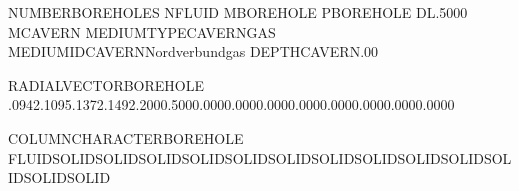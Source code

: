 \documentclass[letterpaper,10pt,english]{sphinxmanual}
\begin{document}
\begin{sphinxVerbatim}[commandchars=\\\{\}]
NUMBER\PYGZus{}BOREHOLES
N\PYGZus{}FLUID
M\PYGZus{}BOREHOLE
P\PYGZus{}BOREHOLE
DL.5000
M\PYGZus{}CAVERN
MEDIUM\PYGZus{}TYPE\PYGZus{}CAVERNGAS
MEDIUM\PYGZus{}ID\PYGZus{}CAVERNNordverbundgas
DEPTH\PYGZus{}CAVERN.00

RADIAL\PYGZus{}VECTOR\PYGZus{}BOREHOLE
.0942.1095.1372.1492.2000.5000.0000.0000.0000.0000.0000.0000.0000.0000

COLUMN\PYGZus{}CHARACTER\PYGZus{}BOREHOLE
FLUIDSOLIDSOLIDSOLIDSOLIDSOLIDSOLIDSOLIDSOLIDSOLIDSOLIDSOLIDSOLIDSOLID


\end{sphinxVerbatim}
\end{document}
